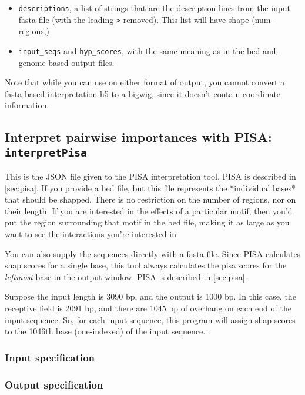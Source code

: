 \documentclass{article}
\begin{document}
\begin{itemize}
    \item \texttt{descriptions}, a list of strings that are the description
        lines from the input fasta file (with the leading \texttt{>} removed).
        This list will have shape (num-regions,)
    \item \texttt{input\_seqs} and \texttt{hyp\_scores}, with the same meaning
        as in the bed-and-genome based output files.
\end{itemize}

Note that while you can use  on either format of
 output, you cannot convert a fasta-based interpretation
h5 to a bigwig, since it doesn't contain coordinate information.


\newpage
\subsection{Interpret pairwise importances with PISA: \texttt{interpretPisa}}\label{prog:interpretPisa}

This is the JSON file given to the PISA interpretation tool. PISA is described
in \ref{sec:pisa}.
If you provide a bed file, but this file represents the *individual bases* that
should be shapped.
There is no restriction on the number of regions, nor on their length.
If you are interested in the effects of a particular motif, then you'd put the
region surrounding that motif in the bed file, making it as large as you want
to see the interactions you're interested in

You can also supply the sequences directly with a fasta file.
Since PISA calculates shap scores for a single base, this tool always calculates
the pisa scores for the \emph{leftmost} base in the output window.
PISA is described in \ref{sec:pisa}.

Suppose the input length is 3090 bp, and the output is 1000 bp.
In this case, the receptive field is 2091 bp, and there are 1045 bp of overhang
on each end of the input sequence.
So, for each input sequence, this program will assign shap scores to the 1046th
base (one-indexed) of the input sequence.
.

\subsubsection{Input specification}



\subsubsection{Output specification}
\end{document}
